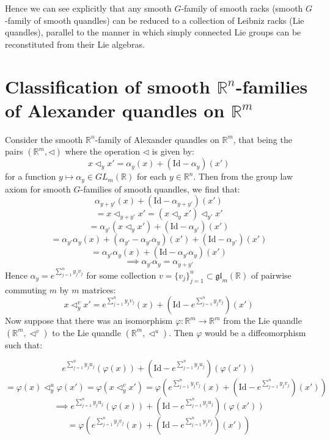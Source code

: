 \documentclass[12pt]{amsart}
\theoremstyle{plain}
\theoremstyle{definition}
\begin{document}
\vspace{5mm}

 
 Hence we can see explicitly that any smooth $G$-family of smooth racks (smooth $G$-family of smooth quandles) can be reduced to a collection of Leibniz racks (Lie quandles), parallel to the manner in which simply connected Lie groups can be reconstituted from their Lie algebras.




 \section{Classification of smooth $\mathbb{R}^n$-families of Alexander quandles on $\mathbb{R}^m$} \label{Sec4}


 Consider the smooth $\mathbb{R}^n$-family of Alexander quandles on $\mathbb{R}^m $, that being the pairs $(\mathbb{R}^m,\triangleleft)$ where the operation $\triangleleft$ is given by:
$$ x \triangleleft_y x' = \alpha_y(x) + (\text{Id} - \alpha_y)(x') $$
for a function $y \mapsto \alpha_y \in GL_m(\mathbb{R}) $ for each $y \in \mathbb{R}^n$. Then from the group law axiom for smooth $G$-families of smooth quandles, we find that:
$$ \alpha_{y+y'}(x) + (\text{Id} - \alpha_{y+y'})(x')$$ $$ = x \triangleleft_{y+y'} x' =  (x \triangleleft_yx' ) \triangleleft_{y'} x' $$ $$ =  \alpha_{y'}(x \triangleleft_{y} x' ) + (\text{Id} - \alpha_{y'})(x') $$
$$ =  \alpha_{y'} \alpha_y(x) + (\alpha_{y'} - \alpha_{y'}\alpha_y)(x')   + (\text{Id} - \alpha_{y'})(x') $$
$$ =  \alpha_{y'} \alpha_y(x) + (\text{Id}  - \alpha_{y'}\alpha_y)(x')    $$
$$ \implies \alpha_{y'} \alpha_{y} = \alpha_{y+y'} $$
Hence $\alpha_y =  e^{ \sum_{j=1}^n y_j v_j }$ for some collection $v=\{v_j\}_{j=1}^n \subset \mathfrak{gl}_m(\mathbb{R})$ of pairwise commuting $m$ by $m$ matrices:
$$ x \triangleleft_y^v x' =  e^{   \sum_{j=1}^n y_j v_j}(x) + (\text{Id} -  e^{  \sum_{j=1}^n y_j v_j })(x') $$
Now suppose that there was an isomorphism $\varphi:\mathbb{R}^m\to \mathbb{R}^m$ from the Lie quandle $(\mathbb{R}^m,\triangleleft^v)$ to the Lie quandle $(\mathbb{R}^m,\triangleleft^{u})$. Then $\varphi$ would be a diffeomorphism such that:

$$  e^{ \sum_{j=1}^ny_j u_j  }(\varphi(x)) + (\text{Id} - e^{\sum_{j=1}^ny_j u_j })(\varphi(x')) $$ $$= \varphi(x)  \triangleleft_y^u \varphi(x') = \varphi(x \triangleleft_y^v x')  = \varphi(e^{\sum_{j=1}^ny_j v_j }(x) + (\text{Id} - e^{\sum_{j=1}^ny_j v_j })(x') ) $$
$$  \implies  e^{ \sum_{j=1}^ny_j u_j }(\varphi(x)) + (\text{Id} - e^{\sum_{j=1}^ny_j u_j })(\varphi(x')) $$ $$= \varphi(e^{\sum_{j=1}^ny_j v_j }(x) + (\text{Id} - e^{\sum_{j=1}^ny_j v_j })(x') ) $$
\end{document}
